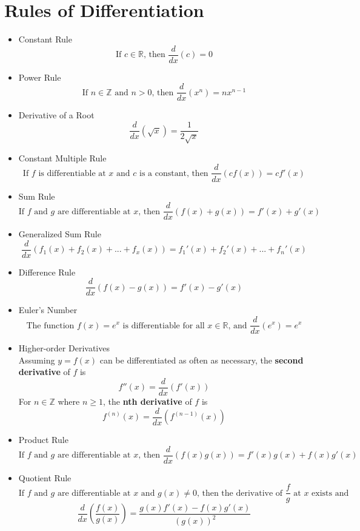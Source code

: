 \documentclass{article}
\begin{document}
\section*{Rules of Differentiation}
\begin{itemize}
    \item Constant Rule
    $$\text{If } c \in \mathbb{R} \text{, then } \frac{d}{dx}\left(c\right) = 0$$
    \item Power Rule
    $$\text{If } n \in \mathbb{Z} \text{ and } n > 0 \text{, then } \frac{d}{dx}\left(x^n\right) = nx^{n - 1}$$
    \item Derivative of a Root
    $$\frac{d}{dx}\left(\sqrt{x}\right) = \frac{1}{2\sqrt{x}}$$
    \item Constant Multiple Rule
    $$\text{If } f \text{ is differentiable at } x \text{ and } c \text{ is a constant, then } \frac{d}{dx}\left(cf(x)\right) = cf'\left(x\right)$$
    \item Sum Rule
    $$\text{If } f \text{ and } g \text{ are differentiable at } x \text{, then } \frac{d}{dx}\left(f(x) + g(x)\right) = f'(x) + g'(x)$$
    \item Generalized Sum Rule
    $$\frac{d}{dx}\left(f_1(x) + f_2(x) + ... + f_x(x)\right) = f_1'(x) + f_2'(x) + ... + f_n'(x)$$
    \item Difference Rule
    $$\frac{d}{dx}\left(f(x) - g(x)\right) = f'(x) - g'(x)$$
    \item Euler's Number
        $$\text{The function } f(x) = e^x \text{ is differentiable for all } x \in \mathbb{R} \text{, and } \frac{d}{dx}\left(e^x\right) = e^x$$
    \item Higher-order Derivatives
    \\ Assuming $y = f(x)$ can be differentiated as often as necessary, the \textbf{second derivative} of $f$ is
    $$f''(x) = \frac{d}{dx}\left(f'(x)\right)$$
    For $n \in \mathbb{Z}$ where $n \geq 1$, the \textbf{nth derivative} of $f$ is
    $$f^{(n)}\left(x\right) = \frac{d}{dx}\left(f^{(n - 1)}\left(x\right)\right)$$
    \item Product Rule
    $$\text{If } f \text{ and } g \text{ are differentiable at } x \text{, then } \frac{d}{dx}\left(f(x)g(x)\right) = f'(x)g(x) + f(x)g'(x)$$
    \item Quotient Rule
        $$\text{If } f \text{ and } g \text{ are differentiable at } x \text{ and } g(x) \neq 0 \text{, then the derivative of } \frac{f}{g} \text{ at } x \text{ exists and}$$
        $$\frac{d}{dx}\left(\frac{f(x)}{g(x)}\right) = \frac{g(x)f'(x) - f(x)g'(x)}{(g(x))^2}$$

\end{itemize}
\end{document}
